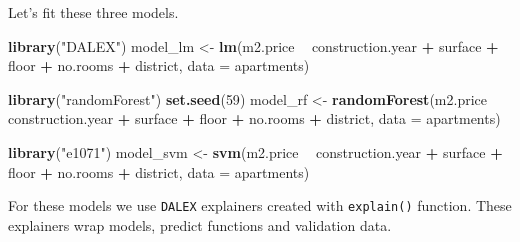 \documentclass[]{krantz}
\newenvironment{Shaded}{\begin{snugshade}}{\end{snugshade}}
\newcommand{\DataTypeTok}[1]{\textcolor[rgb]{0.13,0.29,0.53}{#1}}
\newcommand{\DecValTok}[1]{\textcolor[rgb]{0.00,0.00,0.81}{#1}}
\newcommand{\KeywordTok}[1]{\textcolor[rgb]{0.13,0.29,0.53}{\textbf{#1}}}
\newcommand{\NormalTok}[1]{#1}
\newcommand{\OperatorTok}[1]{\textcolor[rgb]{0.81,0.36,0.00}{\textbf{#1}}}
\newcommand{\StringTok}[1]{\textcolor[rgb]{0.31,0.60,0.02}{#1}}
\theoremstyle{definition}
\theoremstyle{definition}
\theoremstyle{definition}
\theoremstyle{remark}
\begin{document}
Let's fit these three models.

\begin{Shaded}
\begin{Highlighting}[]
\KeywordTok{library}\NormalTok{(}\StringTok{"DALEX"}\NormalTok{)}
\NormalTok{model_lm <-}\StringTok{ }\KeywordTok{lm}\NormalTok{(m2.price }\OperatorTok{~}\StringTok{ }\NormalTok{construction.year }\OperatorTok{+}\StringTok{ }\NormalTok{surface }\OperatorTok{+}\StringTok{ }\NormalTok{floor }\OperatorTok{+}\StringTok{ }
\StringTok{                      }\NormalTok{no.rooms }\OperatorTok{+}\StringTok{ }\NormalTok{district, }\DataTypeTok{data =}\NormalTok{ apartments)}

\KeywordTok{library}\NormalTok{(}\StringTok{"randomForest"}\NormalTok{)}
\KeywordTok{set.seed}\NormalTok{(}\DecValTok{59}\NormalTok{)}
\NormalTok{model_rf <-}\StringTok{ }\KeywordTok{randomForest}\NormalTok{(m2.price }\OperatorTok{~}\StringTok{ }\NormalTok{construction.year }\OperatorTok{+}\StringTok{ }\NormalTok{surface }\OperatorTok{+}\StringTok{ }\NormalTok{floor }\OperatorTok{+}\StringTok{ }
\StringTok{                      }\NormalTok{no.rooms }\OperatorTok{+}\StringTok{ }\NormalTok{district, }\DataTypeTok{data =}\NormalTok{ apartments)}

\KeywordTok{library}\NormalTok{(}\StringTok{"e1071"}\NormalTok{)}
\NormalTok{model_svm <-}\StringTok{ }\KeywordTok{svm}\NormalTok{(m2.price }\OperatorTok{~}\StringTok{ }\NormalTok{construction.year }\OperatorTok{+}\StringTok{ }\NormalTok{surface }\OperatorTok{+}\StringTok{ }\NormalTok{floor }\OperatorTok{+}\StringTok{ }
\StringTok{                         }\NormalTok{no.rooms }\OperatorTok{+}\StringTok{ }\NormalTok{district, }\DataTypeTok{data =}\NormalTok{ apartments)}
\end{Highlighting}
\end{Shaded}

For these models we use \texttt{DALEX} explainers created with
\texttt{explain()} function. These explainers wrap models, predict
functions and validation data.

\begin{Shaded}
\end{Shaded}
\end{document}
